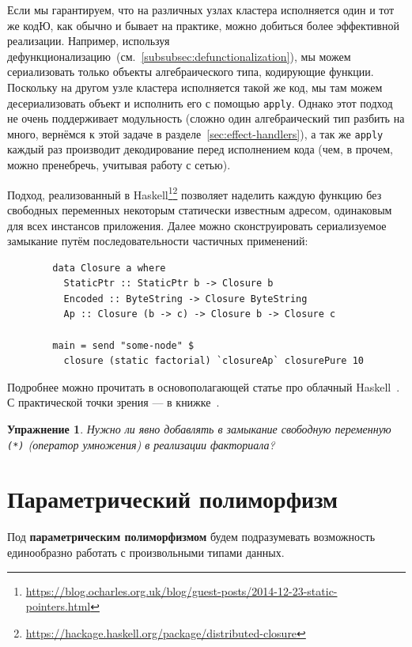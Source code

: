 \documentclass[12pt]{article}
\newcommand{\vocab}[1]{\textbf{#1}} %
\newtheorem{task}{Упражнение}
\begin{document}
    Если мы гарантируем, что на различных узлах кластера исполняется один и тот же кодЮ, как обычно и бывает на практике, можно добиться более эффективной реализации.
    Например, используя дефункционализацию~(см.~\ref{subsubsec:defunctionalization}), мы можем сериализовать только объекты алгебраического типа, кодирующие функции.
    Поскольку на другом узле кластера исполняется такой же код, мы там можем десериализовать объект и исполнить его с помощью \texttt{apply}.
    Однако этот подход не очень поддерживает модульность (сложно один алгебраический тип разбить на много, вернёмся к этой задаче в разделе~\ref{sec:effect-handlers}), а так же \texttt{apply} каждый раз производит декодирование перед исполнением кода (чем, в прочем, можно пренебречь, учитывая работу с сетью).

    Подход, реализованный в Haskell\footnote{\url{https://blog.ocharles.org.uk/blog/guest-posts/2014-12-23-static-pointers.html}}\footnote{\url{https://hackage.haskell.org/package/distributed-closure}} позволяет наделить каждую функцию без свободных переменных некоторым статически известным адресом, одинаковым для всех инстансов приложения.
    Далее можно сконструировать сериализуемое замыкание путём последовательности частичных применений:
    \begin{verbatim}
        data Closure a where
          StaticPtr :: StaticPtr b -> Closure b
          Encoded :: ByteString -> Closure ByteString
          Ap :: Closure (b -> c) -> Closure b -> Closure c

        main = send "some-node" $
          closure (static factorial) `closureAp` closurePure 10
    \end{verbatim}

    Подробнее можно прочитать в основополагающей статье про облачный Haskell~\cite{epstein2011towards}.
    С практической точки зрения --- в книжке~\cite[chapter 16]{marlow2011parallel}.

    \begin{task}
        Нужно ли явно добавлять в замыкание свободную переменную \texttt{(*)} (оператор умножения) в реализации факториала?
    \end{task}


    \section{Параметрический полиморфизм}

    Под \vocab{параметрическим полиморфизмом} будем подразумевать возможность единообразно работать с произвольными типами данных.
\end{document}
